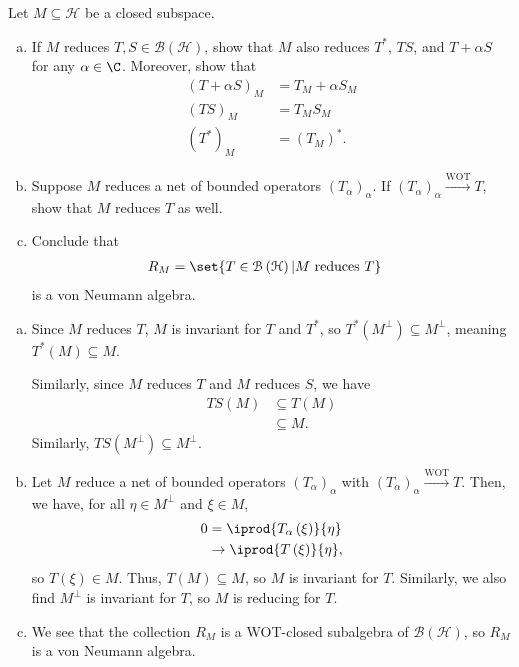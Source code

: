 \documentclass[10pt]{mypackage}
\begin{document}
\begin{exercise}
  Let $M\subseteq \mathcal{H}$ be a closed subspace.
  \begin{enumerate}[(a)]
    \item If $M$ reduces $T,S\in \mathcal{B}\left(\mathcal{H}\right)$, show that $M$ also reduces $T^{\ast}$, $TS$, and $T + \alpha S$ for any $\alpha \in \C$. Moreover, show that
      \begin{align*}
        \left(T + \alpha S\right)_{M} &= T_M + \alpha S_M\\
        \left(TS\right)_M &= T_MS_M\\
        \left(T^{\ast}\right)_{M} &= \left(T_M\right)^{\ast}.
      \end{align*}
    \item Suppose $M$ reduces a net of bounded operators $\left(T_{\alpha}\right)_{\alpha}$. If $\left(T_{\alpha}\right)_{\alpha}\xrightarrow{\text{WOT}} T$, show that $M$ reduces $T$ as well.
    \item Conclude that
      \begin{align*}
        R_M &= \set{T\in \mathcal{B}\left(\mathcal{H}\right) | M\text{ reduces }T}
      \end{align*}
      is a von Neumann algebra.
  \end{enumerate}
\end{exercise}
\begin{solution}\hfill
  \begin{enumerate}[(a)]
    \item Since $M$ reduces $T$, $M$ is invariant for $T$ and $T^{\ast}$, so $T^{\ast}\left(M^{\perp}\right)\subseteq M^{\perp}$, meaning $T^{\ast}\left(M\right) \subseteq M$.\newline

      Similarly, since $M$ reduces $T$ and $M$ reduces $S$, we have
      \begin{align*}
        TS\left(M\right)&\subseteq T\left(M\right)\\
        &\subseteq M.
      \end{align*}
      Similarly, $TS\left(M^{\perp}\right) \subseteq M^{\perp}$.
    \item Let $M$ reduce a net of bounded operators $\left(T_{\alpha}\right)_{\alpha}$ with $\left(T_{\alpha}\right)_{\alpha}\xrightarrow{\text{WOT}}T$. Then, we have, for all $\eta\in M^{\perp}$ and $\xi \in M$,
      \begin{align*}
        0 &= \iprod{T_{\alpha}\left(\xi\right)}{\eta}\\
          &\rightarrow \iprod{T\left(\xi\right)}{\eta},
      \end{align*}
      so $T\left(\xi\right)\in M$. Thus, $T\left(M\right)\subseteq M$, so $M$ is invariant for $T$. Similarly, we also find $M^{\perp}$ is invariant for $T$, so $M$ is reducing for $T$.
    \item We see that the collection $R_M$ is a WOT-closed subalgebra of $\mathcal{B}\left(\mathcal{H}\right)$, so $R_M$ is a von Neumann algebra.
  \end{enumerate}
\end{solution}
\end{document}
